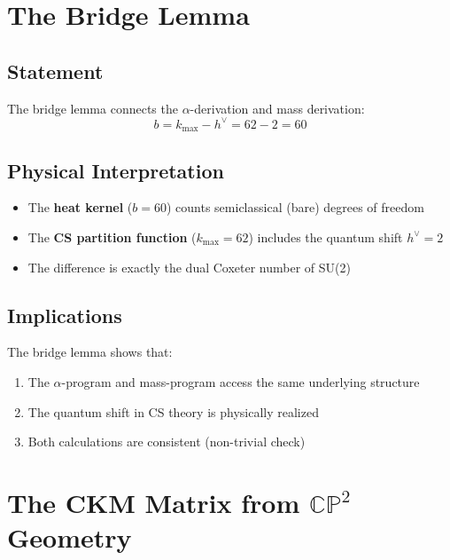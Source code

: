\documentclass[11pt,a4paper]{article}
\newcommand{\CP}{\mathbb{CP}}
\begin{document}
\section{The Bridge Lemma}

\subsection{Statement}

The bridge lemma connects the $\alpha$-derivation and mass derivation:
\begin{equation}
\boxed{b = k_{\max} - h^\vee = 62 - 2 = 60}
\end{equation}

\subsection{Physical Interpretation}

\begin{itemize}
\item The \textbf{heat kernel} ($b = 60$) counts semiclassical (bare) degrees of freedom
\item The \textbf{CS partition function} ($k_{\max} = 62$) includes the quantum shift $h^\vee = 2$
\item The difference is exactly the dual Coxeter number of SU(2)
\end{itemize}

\subsection{Implications}

The bridge lemma shows that:
\begin{enumerate}
\item The $\alpha$-program and mass-program access the same underlying structure
\item The quantum shift in CS theory is physically realized
\item Both calculations are consistent (non-trivial check)
\end{enumerate}

\section{The CKM Matrix from $\CP^2$ Geometry}
\end{document}
